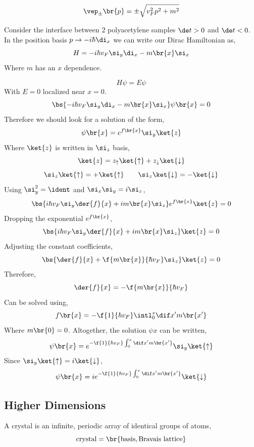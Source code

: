 \documentclass{article}
\begin{document}
\[ \vep_{\pm}\br{p} = \pm \sqrt{v_F^2 p^2 + m^2} \]

Consider the interface between $2$ polyacetylene samples $\de t > 0$ and $\de t < 0$. In the position basis $p \to - i \hbar \di_x$ we can write our Dirac Hamiltonian as,
\[ H = - i \hbar v_F \si_y \di_x - m\br{x} \si_x \]
Where $m$ has an $x$ dependence.

\[  H \psi = E \psi \]
With $E = 0$ localized near $x = 0$.
\[ \bs{- i \hbar v_F \si_y \di_x - m\br{x} \si_x} \psi\br{x} = 0 \]
Therefore we should look for a solution of the form,
\[ \psi\br{x} = e^{f\br{x}} \si_y \ket{z} \]
Where $\ket{z}$ is written in $\si_z$ basis,
\[ \ket{z} = z_{\uparrow} \ket{\uparrow} + z_{\downarrow} \ket{\downarrow} \]
\[ \si_{z}\ket{\uparrow} = + \ket{\uparrow} \qquad \si_{z}\ket{\downarrow} = - \ket{\downarrow} \]
Using $\si_y^2 = \ident$ and $\si_x \si_y = i \si_z$,
\[ \bs{i \hbar v_F \si_y \der{f}{x} + i m\br{x} \si_z} e^{f\br{x}}\ket{z} = 0 \]
Dropping the exponential $e^{f\br{x}}$,
\[ \bs{i \hbar v_F \si_y \der{f}{x} + i m\br{x} \si_z} \ket{z} = 0 \]
Adjusting the constant coefficients,
\[ \bs{\der{f}{x} + \f{m\br{x}}{\hbar v_F} \si_z} \ket{z} = 0 \]
Therefore,
\[ \der{f}{x} = - \f{m\br{x}}{\hbar v_F} \]
Can be solved using,
\[ f\br{x} = - \f{1}{\hbar v_F} \intl_{0}^{x} \dif x' m\br{x'} \]
Where $m\br{0} = 0$. Altogether, the solution $\psi{x}$ can be written,
\[ \psi\br{x} = e^{- \f{1}{\hbar v_F} \int_{0}^{x} \dif x' m\br{x'}} \si_y \ket{\uparrow} \]
Since $\si_y \ket{\uparrow} = i \ket{\downarrow}$,
\[ \psi\br{x} = ie^{- \f{1}{\hbar v_F} \int_{0}^{x} \dif x' m\br{x'}}\ket{\downarrow} \]

\begin{center}
\end{center}

\subsection{Higher Dimensions}

A crystal is an infinite, periodic array of identical groups of atoms,
\[ \text{crystal} = \br{\text{basis}, \text{Bravais lattice}} \]
\end{document}
